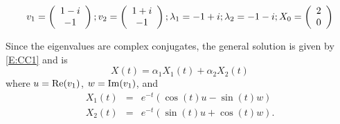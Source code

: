 \documentclass{ximera}
\begin{document}
\begin{exercise} \label{A6.4.3}
\[
v_1 = \left(\begin{array}{cccccccccccc}  1 -i \\ -1 \end{array}\right); v_2 = \left(\begin{array}{cccccccccccc}  1 + i \\ -1  \end{array}\right); \lambda_1 = -1+i;  \lambda_2 = -1-i; X_0 = \left(\begin{array}{rrrrrrrrrrrrrrrrrr} 2 \\ 0 \end{array}\right)
\]

\begin{solution}
\soln Since the eigenvalues are complex conjugates, the general solution is given by \eqref{E:CC1} and is
\[
X(t) = \alpha_1 X_1(t) + \alpha_2 X_2(t)
\]
where $u={\rm Re}(v_1)$, $w={\rm Im}(v_1)$, and 
\[
\begin{array}{rcl}
X_1(t) & = & e^{-t}(\cos(t)u -\sin(t)w)\\
X_2(t) & = & e^{-t}(\sin(t)u +\cos(t)w).
\end{array}
\]
\begin{figure}[htb]
           \centerline{%
           }
\end{figure}
\end{solution}
\end{exercise}
\end{document}
